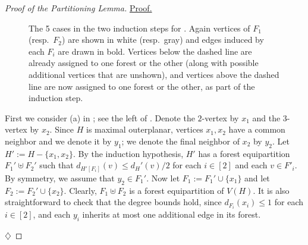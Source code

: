 \documentclass[11pt]{article}
\theoremstyle{definition}
\renewcommand\le\leqslant
\newenvironment{clmproof}[1]{\par\noindent\underline{Proof.}\space#1}{\leavevmode\unskip\penalty9999\hbox{}\nobreak\hfill\quad\hbox{$\diamondsuit$}\smallskip}
\def\mgray{gray!65!white}
\def\drawthick{\draw[line width=.8mm]}
\begin{document}
\begin{proof}[Proof of the Partitioning Lemma]
\begin{clmproof}
\begin{figure}[!t]
	    \caption{The 5 cases in the two induction steps for . Again vertices of $F_1$ (resp.~$F_2$) are shown in white  (resp.~gray) and edges induced by each $F_i$ are drawn in bold.  Vertices below the dashed line are already assigned to one forest or the other (along with possible additional vertices that are unshown), and vertices above the dashed line are now assigned to one forest or the other, as part of the induction step.}
        \label{induction-step-fig}
    \end{figure}

	First we consider (a) in ; see the left of .  Denote the $2$-vertex by $x_1$ and the $3$-vertex by $x_2$.  
	Since $H$ is maximal outerplanar, vertices $x_1,x_2$ have a common neighbor and we denote it by $y_1$; we denote the final neighbor of $x_2$ by $y_2$.  
	Let $H':=H-\{x_1,x_2\}$.  By the induction hypothesis, $H'$ has a forest equipartition $F_1'\uplus F_2'$ such that 
	$d_{H'[F_i]}(v)\le d_H'(v)/2$ for each $i\in [2]$ and each $v\in F'_i$.  By symmetry, we assume that $y_2\in F_1'$.
	Now let $F_1:=F_1'\cup\{x_1\}$ and let $F_2:=F_2'\cup\{x_2\}$.  Clearly, $F_1\uplus F_2$ is a forest equipartition of $V(H)$.  
	It is also straightforward to check that the degree bounds hold, since $d_{F_i}(x_i)\le 1$ for each $i\in[2]$, and
	each $y_i$ inherits at most one additional edge in its forest.


\end{clmproof}
\end{proof}
\end{document}
